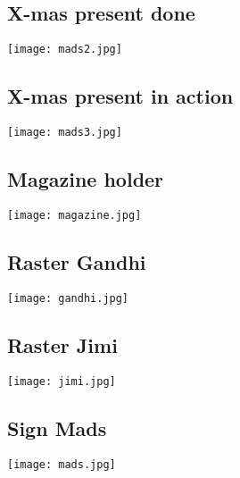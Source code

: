 \documentclass[11pt]{beamer}
\begin{document}
\subsection*{X-mas present done}\begin{frame}[fragile]
\label{sec-6.4}

\texttt{[image: mads2.jpg]}

\end{frame}
\subsection*{X-mas present in action}\begin{frame}[fragile]
\label{sec-6.5}

\texttt{[image: mads3.jpg]}

\end{frame}
\subsection*{Magazine holder}\begin{frame}[fragile]
\label{sec-6.6}

\texttt{[image: magazine.jpg]}

\end{frame}
\subsection*{Raster Gandhi}\begin{frame}[fragile]
\label{sec-6.7}

\texttt{[image: gandhi.jpg]}

\end{frame}
\subsection*{Raster Jimi}\begin{frame}[fragile]
\label{sec-6.8}

\texttt{[image: jimi.jpg]}

\end{frame}
\subsection*{Sign Mads}\begin{frame}[fragile]
\label{sec-6.9}

\texttt{[image: mads.jpg]}

\end{frame}
\end{document}
